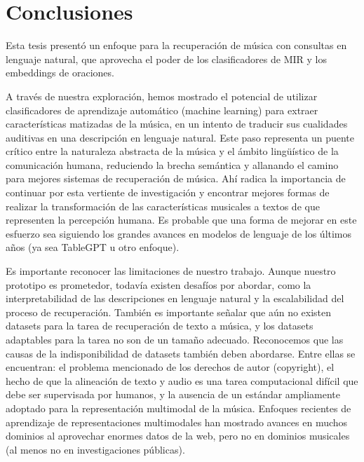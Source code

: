\chapter*{Conclusiones}
\label{chap:conclusions}
Esta tesis presentó un enfoque para la recuperación de música con consultas en lenguaje natural, que aprovecha el poder de los clasificadores de MIR y los embeddings de oraciones.

A través de nuestra exploración, hemos mostrado el potencial de utilizar clasificadores de aprendizaje automático (machine learning) para extraer características matizadas de la música, en un intento de traducir sus cualidades auditivas en una descripción en lenguaje natural. Este paso representa un puente crítico entre la naturaleza abstracta de la música y el ámbito lingüístico de la comunicación humana, reduciendo la brecha semántica y allanando el camino para mejores sistemas de recuperación de música. Ahí radica la importancia de continuar por esta vertiente de investigación y encontrar mejores formas de realizar la transformación de las características musicales a textos de que representen la percepción humana. Es probable que una forma de mejorar en este esfuerzo sea siguiendo los grandes avances en modelos de lenguaje de los últimos años (ya sea TableGPT u otro enfoque).


Es importante reconocer las limitaciones de nuestro trabajo. Aunque nuestro prototipo es prometedor, todavía existen desafíos por abordar, como la interpretabilidad de las descripciones en lenguaje natural y la escalabilidad del proceso de recuperación. También es importante señalar que aún no existen datasets para la tarea de recuperación de texto a música, y los datasets adaptables para la tarea no son de un tamaño adecuado. Reconocemos que las causas de la indisponibilidad de datasets también deben abordarse. Entre ellas se encuentran: el problema mencionado de los derechos de autor (copyright), el hecho de que la alineación de texto y audio es una tarea computacional difícil que debe ser supervisada por humanos, y la ausencia de un estándar ampliamente adoptado para la representación multimodal de la música. Enfoques recientes de aprendizaje de representaciones multimodales han mostrado avances en muchos dominios al aprovechar enormes datos de la web, pero no en dominios musicales (al menos no en investigaciones públicas).


